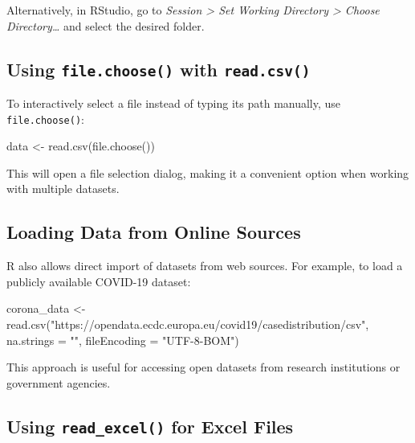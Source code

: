 \documentclass[
  11pt,
]{book}
\makeatletter
\newenvironment{Shaded}{}{}
\newcommand{\AttributeTok}[1]{#1}
\newcommand{\FunctionTok}[1]{#1}
\newcommand{\NormalTok}[1]{#1}
\newcommand{\OtherTok}[1]{\textcolor[rgb]{0.39,0.39,0.39}{#1}}
\newcommand{\StringTok}[1]{\textcolor[rgb]{0.39,0.39,0.39}{#1}}
\newenvironment{kframe}{%
\medskip{}
\setlength{\fboxsep}{.8em}
 \def\at@end@of@kframe{}%
 \ifinner\ifhmode%
  \def\at@end@of@kframe{\end{minipage}}%
  \begin{minipage}{\columnwidth}%
 \fi\fi%
 \def\FrameCommand##1{\hskip\@totalleftmargin \hskip-\fboxsep
 \colorbox{shadecolor}{##1}\hskip-\fboxsep
     \hskip-\linewidth \hskip-\@totalleftmargin \hskip\columnwidth}%
 \MakeFramed {\advance\hsize-\width
   \@totalleftmargin\z@ \linewidth\hsize
   \@setminipage}}%
 {\par\unskip\endMakeFramed%
 \at@end@of@kframe}
\renewenvironment{Shaded}{\begin{kframe}}{\end{kframe}}
\theoremstyle{definition}
\theoremstyle{definition}
\theoremstyle{definition}
\theoremstyle{definition}
\theoremstyle{remark}
\makeatother
\begin{document}
Alternatively, in RStudio, go to \emph{Session \textgreater{} Set Working Directory \textgreater{} Choose Directory\ldots{}} and select the desired folder.

\subsection*{\texorpdfstring{Using \texttt{file.choose()} with \texttt{read.csv()}}{Using file.choose() with read.csv()}}\label{using-file.choose-with-read.csv}


To interactively select a file instead of typing its path manually, use \texttt{file.choose()}:

\begin{Shaded}
\begin{Highlighting}[]
\NormalTok{data }\OtherTok{\textless{}{-}} \FunctionTok{read.csv}\NormalTok{(}\FunctionTok{file.choose}\NormalTok{())}
\end{Highlighting}
\end{Shaded}

This will open a file selection dialog, making it a convenient option when working with multiple datasets.

\subsection*{Loading Data from Online Sources}\label{loading-data-from-online-sources}


R also allows direct import of datasets from web sources. For example, to load a publicly available COVID-19 dataset:

\begin{Shaded}
\begin{Highlighting}[]
\NormalTok{corona\_data }\OtherTok{\textless{}{-}} \FunctionTok{read.csv}\NormalTok{(}\StringTok{"https://opendata.ecdc.europa.eu/covid19/casedistribution/csv"}\NormalTok{, }\AttributeTok{na.strings =} \StringTok{""}\NormalTok{, }\AttributeTok{fileEncoding =} \StringTok{"UTF{-}8{-}BOM"}\NormalTok{)}
\end{Highlighting}
\end{Shaded}

This approach is useful for accessing open datasets from research institutions or government agencies.

\subsection*{\texorpdfstring{Using \texttt{read\_excel()} for Excel Files}{Using read\_excel() for Excel Files}}\label{using-read_excel-for-excel-files}
\end{document}

